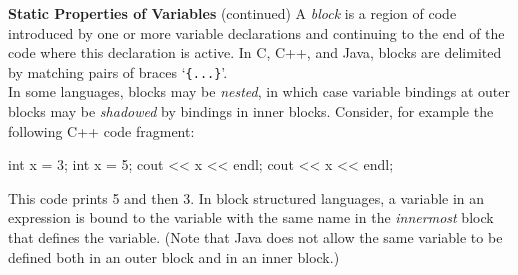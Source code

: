 \begin{minipage}[t]{\sw}
\slidenumber
\LARGE
{\bf Static Properties of Variables} (continued)\exx
A {\em block} is a region of code
introduced by one or more variable declarations
and continuing to the end of the code
where this declaration is active.
In C, C++, and Java, blocks are delimited by matching pairs
of braces `\verb'{...}''.\\[2ex]
In some languages, blocks may be {\em nested}, in which case
variable bindings at outer blocks may be {\em shadowed}
by bindings in inner blocks.
Consider, for example the following C++ code fragment:
\begin{qv}
{ int x = 3;
   { int x = 5;
     cout << x << endl;
   }
   cout << x << endl;
}
\end{qv}
This code prints 5 and then 3.\exx
In block structured languages,
a variable in an expression is bound
to the variable with the same name
in the {\em innermost} block that defines the variable.
(Note that Java does not allow the same variable to be defined
both in an outer block and in an inner block.)
\end{minipage}
\clearpage

